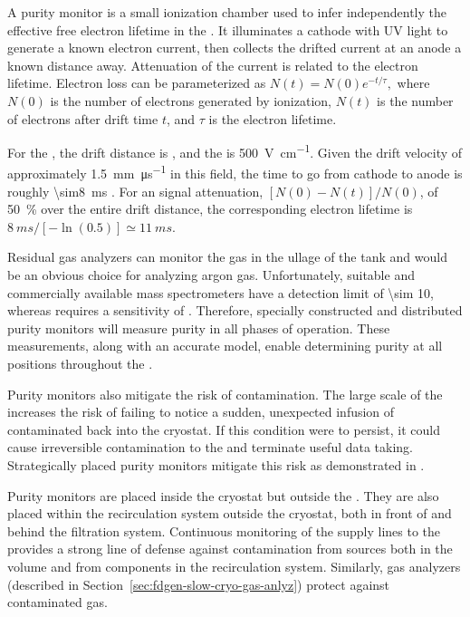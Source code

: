 A purity monitor is a small ionization chamber used to infer independently  the effective free electron lifetime in the \lartpc.  
It illuminates a cathode with UV light to generate a known electron current, then collects the drifted current at an anode a known distance away.  Attenuation of the current is related to the electron lifetime.
Electron loss can be parameterized as
%
\(N(t) = N(0)e^{-t/\tau},\)
%
where $N(0)$ is the number of electrons generated by ionization, $N(t)$ is the number of electrons after drift time $t$, and $\tau$ is the electron lifetime. 

For the , the drift distance is \dpmaxdrift, and the \efield is \SI{500}{\volt\per\centi\meter}. Given the drift velocity of approximately \SI{1.5}{\milli\meter\per\micro\second} in this field, the time to go from cathode to anode is roughly \SI{\sim8}{\milli\second} \cite{Walkowiak:2000wf}.
For an \lar {} signal attenuation, \([N(0)-N(t)]/N(0)\), of \SI{50}{\percent} over the entire drift distance,
 the corresponding electron lifetime is $\SI{8}{ms}/[-\ln(0.5)] \simeq \SI{11}{ms}$.

Residual gas analyzers can monitor the gas in the ullage of the tank and would be an obvious choice for analyzing argon gas. 
Unfortunately, suitable and commercially available mass
spectrometers have a detection limit of \SI{\sim 10}{},
whereas  requires a sensitivity of . Therefore,
specially constructed and distributed purity monitors will measure \lar purity in all %
phases of operation. %
These measurements,
along with an accurate  model, enable 
determining  purity at all positions throughout the .


Purity monitors also %
mitigate the risk of \lar contamination.  The large scale of the  increases the risk of failing to notice a sudden, unexpected infusion of contaminated \lar %
back into the cryostat.   
If this condition were to persist, it could cause irreversible contamination to the  and terminate useful data taking.  Strategically placed purity monitors mitigate this risk as demonstrated in . 

Purity monitors are placed inside the cryostat but outside the %
. They are also placed  within the recirculation system outside the cryostat, both in front of and behind the filtration system. %
Continuous monitoring of  the \lar supply lines to the  provides a strong line of defense against %
contamination from sources both in the \lar volume and from components in the recirculation system. 
Similarly, gas analyzers (described in Section~\ref{sec:fdgen-slow-cryo-gas-anlyz}) %
protect against contaminated gas.  

